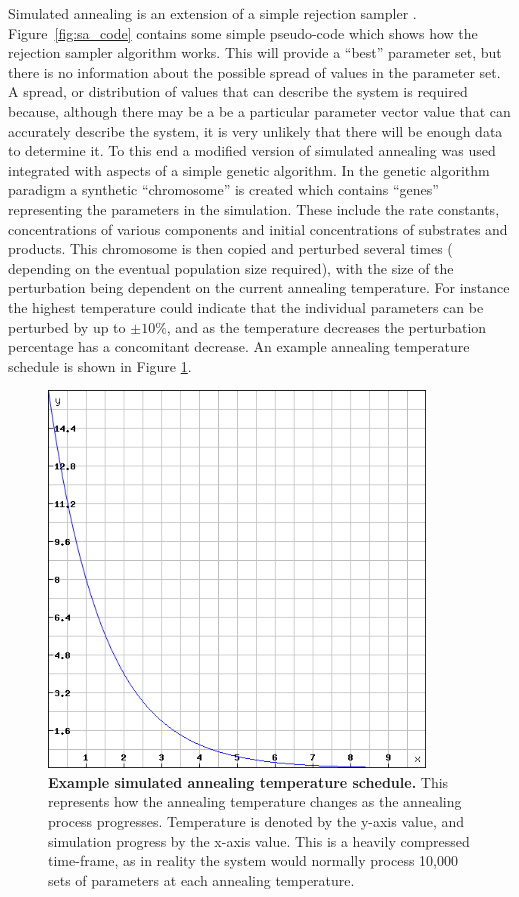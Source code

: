 Simulated annealing is an extension of a simple rejection sampler \cite{Marjoram2003}. Figure~\ref{fig:sa_code} contains some simple pseudo-code which shows how the rejection sampler algorithm works. This will provide a ``best'' parameter set, but there is no information about the possible spread of values in the parameter set. A spread, or distribution of values that can describe the system is required because, although there may be a be a particular parameter vector value that can accurately describe the system, it is very unlikely that there will be enough data to determine it. To this end a modified version of simulated annealing was used integrated with aspects of a simple genetic algorithm. In the genetic algorithm paradigm a synthetic ``chromosome'' is created which contains ``genes'' representing the parameters in the simulation. These include the rate constants, concentrations of various components and initial concentrations of substrates and products. This chromosome is then copied and perturbed 
several times (
depending on the
eventual population size required), with the size of the perturbation being dependent on the current annealing temperature. For instance the highest temperature could indicate that the individual parameters can be perturbed by up to $\pm 10\%$, and as the temperature decreases the perturbation percentage has a concomitant decrease. An example annealing temperature schedule is shown in Figure \ref{fig:temperature}.
\begin{figure}[!ht]
	\begin{center}
		\includegraphics[height=10cm]{03-parameterestimationmethodologies/data/temperature.png}
	\caption[Example simulated annealing temperature schedule]{{\bf Example simulated annealing temperature schedule.} This represents how the annealing temperature changes as the annealing process progresses. Temperature is denoted by the y-axis value, and simulation progress by the x-axis value. This is a heavily compressed time-frame, as in reality the system would normally process 10,000 sets of parameters at each annealing temperature.
	\label{fig:temperature}}
	\end{center}
\end{figure}
